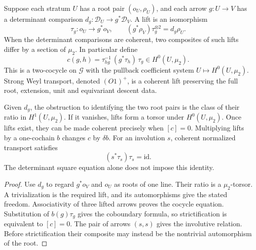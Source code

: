\begin{definition}
\label{def:O1-plus-weyl-transport}
\label{def:orientation-projective-cocycle-coR}
Suppose each stratum \(U\) has a root pair \((o_U,\rho_U)\), and
each arrow \(g:U\to V\) has a determinant comparison
\(d_g:\mathscr D_U\to g^*\mathscr D_V\).
A lift is an isomorphism
\[
 \tau_g:o_U\longrightarrow g^*o_V,
 \qquad (g^*\rho_V)\tau_g^{\otimes2}=d_g\rho_U.
\]
When the determinant comparisons are coherent, two composites of such
lifts differ by a section of \(\mu_2\).  In particular define
\[
 c(g,h)=\tau_{hg}^{-1}\,(g^*\tau_h)\,\tau_g
 \in H^0(U,\mu_2).
\]
This is a two-cocycle on \(\mathcal G\) with the pullback coefficient
system \(U\mapsto H^0(U,\mu_2)\).  Strong Weyl transport, denoted
\((O1)^+\), is a coherent lift preserving the full root, extension,
unit and equivariant descent data.
\end{definition}

\begin{proposition}
\label{prop:weyl-wall-transport-tau-construction}
\label{prop:weyl-wall-transport-tau-square}
\label{prop:orientation-cocycle-class-vanishing-criterion}
\label{prop:orientation-cocycle-cochain-trivialization-criterion}
\label{prop:weyl-orientation-torsor-defect-computation}
\label{prop:weyl-orientation-torsor-defect-vanishing}
Given \(d_g\), the obstruction to identifying the two root pairs is
the class of their ratio in \(H^1(U,\mu_2)\).  If it vanishes, lifts
form a torsor under \(H^0(U,\mu_2)\).  Once lifts exist, they can be
made coherent precisely when \([c]=0\).  Multiplying lifts by a
one-cochain \(b\) changes \(c\) by \(\delta b\).
For an involution \(s\), coherent normalized transport satisfies
\[
 (s^*\tau_s)\tau_s=\mathrm{id}.
\]
The determinant square equation alone does not impose this identity.
\end{proposition}
\begin{proof}
Use \(d_g\) to regard \(g^*o_V\) and \(o_U\) as roots of one line.
Their ratio is a \(\mu_2\)-torsor.  A trivialization is the required
lift, and its automorphisms give the stated freedom.  Associativity
of three lifted arrows proves the cocycle equation.  Substitution of
\(b(g)\tau_g\) gives the coboundary formula, so strictification is
equivalent to \([c]=0\).  The pair of arrows \((s,s)\) gives the
involutive relation.  Before strictification their composite may
instead be the nontrivial automorphism of the root.
\end{proof}

